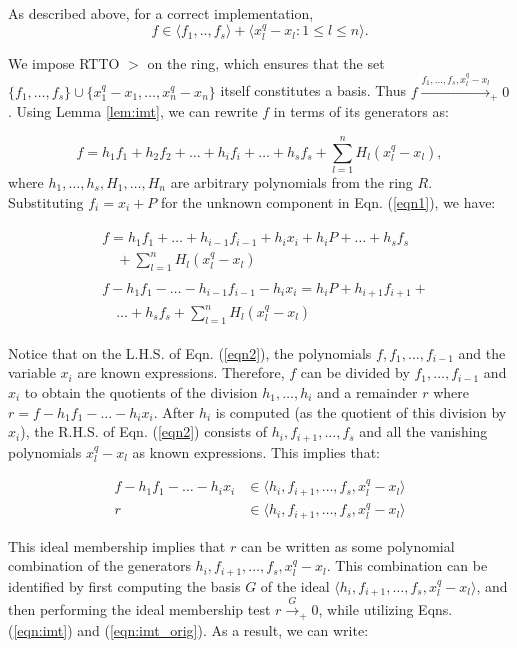 As described above, for a correct implementation,
$$f \in \langle f_1,..,f_s\rangle + \langle x_l^q-x_l: 1\le l \le n\rangle.$$

We impose RTTO $>$ on the ring, which ensures that the set
$\{f_1,\dots,f_s\}\cup \{x_1^q-x_1,\dots,x_n^q-x_n\}$ itself
constitutes a \Grobner basis. Thus
$f\xrightarrow{f_1,\dots,f_s,x_l^q-x_l}_+0$. Using Lemma
\ref{lem:imt}, we can rewrite $f$ in terms of its generators as:   

\begin{equation}\label{eqn1}
f = h_1f_1 + h_2f_2 + \dots+h_if_i+\dots+h_sf_s + \sum_{l=1}^n H_l
(x_l^q-x_l),
\end{equation}
where $h_1,\dots,h_s,H_1,\dots,H_n$ are arbitrary polynomials from the ring
$R$. Substituting $f_i = x_i + P$ for the unknown component in
Eqn. (\ref{eqn1}), we have: 

\begin{eqnarray}
  \begin{split}
    & f  = h_1f_1 +\dots+h_{i-1}f_{i-1}+h_ix_i+h_iP+\dots+h_sf_s\\
    & \quad +\sum_{l=1}^n H_l (x_l^q-x_l)
  \end{split}\\  
  \begin{split}
    & f - h_1f_1 -\dots-h_{i-1}f_{i-1}-h_ix_i = h_iP+h_{i+1}f_{i+1}+\\
    & \quad \dots+h_sf_s +\sum_{l=1}^n H_l (x_l^q-x_l) \label{eqn2}
\end{split}
\end{eqnarray}

Notice that on the L.H.S. of Eqn. (\ref{eqn2}), the polynomials $f,
f_1,\dots,f_{i-1}$ and the variable $x_i$ are known
expressions. Therefore, $f$ can be divided by $f_1,\dots,f_{i-1}$ and
$x_i$ to obtain the quotients of the division $h_1,\dots,h_i$ and a
remainder $r$ where $r = f - h_1f_1 - \dots-h_ix_i$.
After $h_i$ is computed (as the quotient of this division by $x_i$), 
the R.H.S. of Eqn. (\ref{eqn2}) consists of $h_i, f_{i+1}, \dots, f_s$
and all the vanishing polynomials $x_l^q-x_l$ as known
expressions. This implies that: 

\begin{eqnarray}
f - h_1f_1 - \dots-h_ix_i & \in \langle h_i,f_{i+1},\dots,f_s,  x_l^q-x_l\rangle\\
r & \in \langle h_i,f_{i+1},\dots,f_s, x_l^q-x_l\rangle\label{eqn3}
\end{eqnarray}

This ideal membership implies that $r$ can be written as some
polynomial combination of the generators $h_i,f_{i+1},\dots,f_s,
x_l^q-x_l$. This combination can be identified by first computing the
\Grobner basis $G$ of the ideal $\langle
h_i,f_{i+1},\dots,f_s,x_l^q-x_l\rangle$, and then performing the ideal
membership test $r\xrightarrow{G}_+0$, while utilizing
Eqns. (\ref{eqn:imt}) and (\ref{eqn:imt_orig}). As a result, we can
write:

